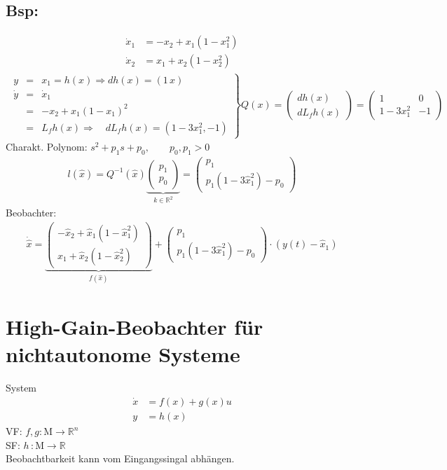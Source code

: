 \documentclass[ngerman]{tudscrreprt}
\begin{document}
\subsection*{Bsp:} \begin{align*}
\dot x_1 &= -x_2 + x_1 (1- x_1^2)\\ 
\dot x_2 &= x_1 + x_2(1- x_2^2)
\end{align*}
\begin{align*}
\left.\begin{matrix}
y &=& x_1 = h(x) \Rightarrow dh(x) = (1\,x) \\ 
\dot y&=& \dot x_1\\ 
&=& -x_2 + x_1(1-x_1)^2\\ 
&=& L_f h(x) \Rightarrow \quad dL_fh(x) = (1-3x_1^2, -1)\end{matrix}\right\}Q(x) = \begin{pmatrix} dh(x)\\ dL_fh(x)\end{pmatrix} = \begin{pmatrix} 1 & 0\\ 1- 3x_1^2 & -1\end{pmatrix}
\end{align*}
Charakt. Polynom: $s^2 + p_1 s + p_0, \qquad p_0, p_1 > 0 $
\begin{align*}
l(\hat x) = Q^{-1}(\hat x) \underbrace{\begin{pmatrix} p_1\\p_0\end{pmatrix}}_{k\in\mathbb{R}^2} =\begin{pmatrix} p_1\\ p_1(1-3\hat x_1^2) - p_0 \end{pmatrix} 
\end{align*}
Beobachter: \begin{align*}
\dot{\hat x} = \underbrace{\begin{pmatrix} - \hat x_2 + \hat x_1(1- \hat x_1^2)\\ \hat x_1 + \hat x_2(1-\hat x_2^2)\end{pmatrix}  }_{f(\hat x)} + \begin{pmatrix} p_1\\ p_1(1-3\hat x_1^2) - p_0\end{pmatrix} \cdot (y(t) - \hat x_1) 
\end{align*}
\section{High-Gain-Beobachter für nichtautonome Systeme}System \begin{align*}
\dot x &= f(x) + g(x)u\\ 
y&= h(x) \tag{6.2}
\end{align*}
VF: $f,g: \mathrm{M} \to \mathbb{R}^n$\\ 
SF: $h\, :\mathrm{M} \to \mathbb{R}$\\ 
Beobachtbarkeit kann vom Eingangssingal abhängen.\\ 
\end{document}
